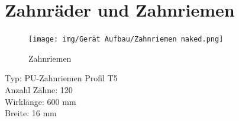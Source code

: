 %





\section{Zahnräder und Zahnriemen}\label{sec:ZahnräderuZahnrad}













\begin{figure}[H]
  \texttt{[image: img/Gerät Aufbau/Zahnriemen naked.png]}
  \centering
  \caption{Zahnriemen}
  \label{fig:Zahnriemen}
\end{figure}

Typ: PU-Zahnriemen Profil T5\\

Anzahl Zähne: 120\\

Wirklänge: 600 mm \\

Breite: 16 mm
